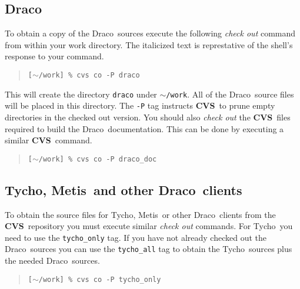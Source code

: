 \documentclass[10pt]{nmemo}
\newcommand{\comp}[1]{\normalfont\normalsize\texttt{#1}}
\newcommand{\draco}{{\normalfont\sffamily Draco}}
\newcommand{\tycho}{{\normalfont\sffamily Tycho}}
\newcommand{\metis}{{\normalfont\sffamily Metis}}
\newcommand{\cvs}{{\normalfont\bfseries CVS}}
\begin{document}
\subsection{\draco}

To obtain a copy of the \draco\ sources execute the following
\emph{check out} command from within your work directory.  The
italicized text is represtative of the shell's response to your
command.

\footnotesize
\begin{verse}
\texttt{[$\sim$/work] \% cvs co -P draco} \\
\end{verse}
\normalsize

This will create the directory \comp{draco} under \comp{$\sim$/work}.  All
of the \draco\ source files will be placed in this directory.  The
\comp{-P} tag instructs \cvs\ to prune empty directories in the
checked out version.  You should also \emph{check out} the \cvs\ files 
required to build the \draco\ documentation.  This can be done by
executing a similar \cvs\ command.

\footnotesize
\begin{verse}
\texttt{[$\sim$/work] \% cvs co -P draco\_doc} \\
\end{verse}
\normalsize

\subsection{\tycho, \metis\ and other \draco\ clients}

To obtain the source files for \tycho, \metis\ or other \draco\ 
clients from the \cvs\ repository you must execute similar 
\emph{check out} commands.  For \tycho\ you need to use the
\comp{tycho\_only} tag.  If you have not already checked out the
\draco\ sources you can use the \comp{tycho\_all} tag to obtain the
\tycho\ sources plus the needed \draco\ sources.

\footnotesize
\begin{verse}
\texttt{[$\sim$/work] \% cvs co -P tycho\_only}
\end{verse}
\normalsize
\end{document}
